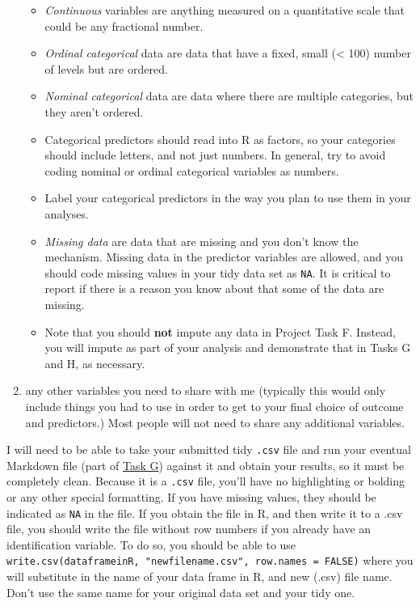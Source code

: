 \documentclass[]{book}
\providecommand{\tightlist}{%
  \setlength{\itemsep}{0pt}\setlength{\parskip}{0pt}}
\theoremstyle{definition}
\theoremstyle{definition}
\theoremstyle{definition}
\theoremstyle{remark}
\begin{document}
\begin{enumerate}
  \begin{itemize}
  \tightlist
  \item
    \emph{Continuous} variables are anything measured on a quantitative
    scale that could be any fractional number.
  \item
    \emph{Ordinal categorical} data are data that have a fixed, small
    (\textless{} 100) number of levels but are ordered.
  \item
    \emph{Nominal categorical} data are data where there are multiple
    categories, but they aren't ordered.
  \item
    Categorical predictors should read into R as factors, so your
    categories should include letters, and not just numbers. In general,
    try to avoid coding nominal or ordinal categorical variables as
    numbers.
  \item
    Label your categorical predictors in the way you plan to use them in
    your analyses.
  \item
    \emph{Missing data} are data that are missing and you don't know the
    mechanism. Missing data in the predictor variables are allowed, and
    you should code missing values in your tidy data set as \texttt{NA}.
    It is critical to report if there is a reason you know about that
    some of the data are missing.
  \item
    Note that you should \textbf{not} impute any data in Project Task F.
    Instead, you will impute as part of your analysis and demonstrate
    that in Tasks G and H, as necessary.
  \end{itemize}
\item
  any other variables you need to share with me (typically this would
  only include things you had to use in order to get to your final
  choice of outcome and predictors.) Most people will not need to share
  any additional variables.
\end{enumerate}

I will need to be able to take your submitted tidy \texttt{.csv} file
and run your eventual Markdown file (part of
\protect\hyperlink{taskG}{Task G}) against it and obtain your results,
so it must be completely clean. Because it is a \texttt{.csv} file,
you'll have no highlighting or bolding or any other special formatting.
If you have missing values, they should be indicated as \texttt{NA} in
the file. If you obtain the file in R, and then write it to a .csv file,
you should write the file without row numbers if you already have an
identification variable. To do so, you should be able to use
\texttt{write.csv(dataframeinR,\ "newfilename.csv",\ row.names\ =\ FALSE)}
where you will substitute in the name of your data frame in R, and new
(.csv) file name. Don't use the same name for your original data set and
your tidy one.
\end{document}
